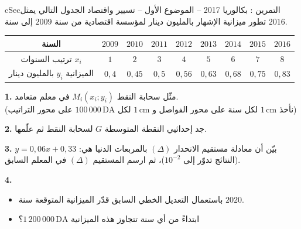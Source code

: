 \documentclass[12pt,a4paper]{article}
\newenvironment{BOX}[2]{\begin{otherlanguage}{english}\begin{arbox}{#1}{#2}}{\end{arbox}\end{otherlanguage}}
\newcounter{exo}
\newenvironment{tamrin}[1]{\stepcounter{exo}\begin{BOX}{cSec}{التمرين \theexo: #1}}{\end{BOX}}
\newenvironment{sq}{\begin{itemize}[leftmargin=2.4em,itemsep=3pt]}{\end{itemize}}
\newcommand{\qa}{\item[(أ)]}\newcommand{\qb}{\item[(ب)]}\newcommand{\qc}{\item[(جـ)]}\newcommand{\qd}{\item[(د)]}\newcommand{\qe}{\item[(هـ)]}
\newcommand{\QQ}[1]{\par\smallskip\textbf{#1.} }
\begin{document}
\begin{tamrin}{بكالوريا 2017 -- الموضوع الأول -- تسيير واقتصاد}
الجدول التالي يمثل تطور ميزانية الإشهار بالمليون دينار لمؤسسة اقتصادية من سنة $2009$ إلى سنة $2016$.
\begin{center}
\begin{tabular}{|C|c|c|c|c|c|c|c|c|}\hline
{} السنة & $2009$ & $2010$ & $2011$ & $2012$ & $2013$ & $2014$ & $2015$ & $2016$\\\hline
ترتيب السنوات $x_i$ & $1$ & $2$ & $3$ & $4$ & $5$ & $6$ & $7$ & $8$\\\hline
الميزانية $y_i$ بالمليون دينار & $0{,}4$ & $0{,}45$ & $0{,}5$ & $0{,}56$ & $0{,}63$ & $0{,}68$ & $0{,}75$ & $0{,}83$\\\hline
\end{tabular}
\end{center}

\QQ{1} مثّل سحابة النقط $M_i(x_i;y_i)$ في معلم متعامد.\\
(نأخذ $1\,\text{cm}$ لكل سنة على محور الفواصل و $1\,\text{cm}$ لكل $100\,000\,\text{DA}$ على محور التراتيب)
\QQ{2} جد إحداثيي النقطة المتوسطة $G$ لسحابة النقط ثم علّمها.
\QQ{3} بيّن أن معادلة مستقيم الانحدار $(\Delta)$ بالمربعات الدنيا هي: $y=0{,}06x+0{,}33$ (النتائج تدوّر إلى $10^{-2}$)، ثم ارسم المستقيم $(\Delta)$ في المعلم السابق.
\QQ{4}
\begin{sq}
\qa باستعمال التعديل الخطي السابق قدّر الميزانية المتوقعة سنة $2020$.
\qb ابتداءً من أي سنة تتجاوز هذه الميزانية $1\,200\,000\,\text{DA}$؟
\end{sq}
\end{tamrin}
\Needspace{14.5cm}
\end{document}
